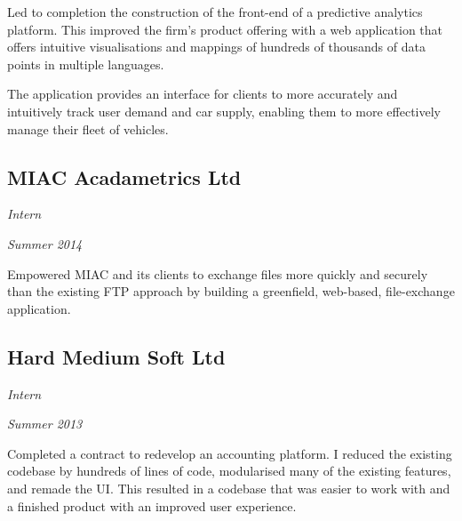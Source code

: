 Led to completion the construction of the front-end of a predictive analytics
platform. This improved the firm's product offering with a web application that
offers intuitive visualisations and mappings of hundreds of thousands of data
points in multiple languages.

The application provides an interface for clients to more accurately and
intuitively track user demand and car supply, enabling them to more effectively
manage their fleet of vehicles.

\subsection*{MIAC Acadametrics Ltd}
\noindent\begin{minipage}[b]{0.5\textwidth}
  \flushleft
  \emph{Intern}
\end{minipage}
\noindent\begin{minipage}[b]{0.5\textwidth}
  \flushright
  \emph{Summer 2014}
\end{minipage}

Empowered MIAC and its clients to exchange files more quickly and securely than
the existing FTP approach by building a greenfield, web-based, file-exchange
application.

\subsection*{Hard Medium Soft Ltd}
\noindent\begin{minipage}[b]{0.5\textwidth}
  \flushleft
  \emph{Intern}
\end{minipage}
\noindent\begin{minipage}[b]{0.5\textwidth}
  \flushright
  \emph{Summer 2013}
\end{minipage}

Completed a contract to redevelop an accounting platform. I reduced the existing
codebase by hundreds of lines of code, modularised many of the existing
features, and remade the UI. This resulted in a codebase that was easier to work
with and a finished product with an improved user experience.

